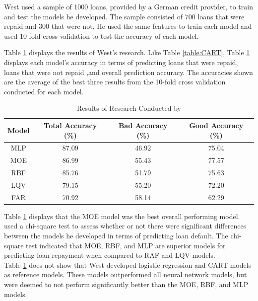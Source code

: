 West used a sample of 1000 loans, provided by a German credit provider, to train and test the models he developed. The sample consisted of 700 loans that were repaid and 300 that were not. He used the same features to train each model and used 10-fold cross validation to test the accuracy of each model. 

\vspace{10pt}

Table \ref{table:NN} displays the results of West's research. Like Table \ref{table:CART}, Table \ref{table:NN} displays each model's accuracy in terms of predicting loans that were repaid, loans that were not repaid ,and overall prediction accuracy. The accuracies shown are the average of the best three results from the 10-fold cross validation conducted for each model. 

\vspace{10pt}

\begin{table}[H]
\begin{center}
\begin{tabular}{|c|c|c|c|} 
\hline
\multicolumn{1}{|c}{Model}  &\multicolumn{1}{|c|}{Total Accuracy (\%)}  &\multicolumn{1}{|c|}{Bad Accuracy (\%)} & \multicolumn{1}{c|}{Good Accuracy (\%)}\\
\hline
MLP & 87.09 &  46.92 & 75.04 \\
\hline
MOE & 86.99 &  55.43 & 77.57 \\
\hline
RBF & 85.76 &  51.79 & 75.63 \\
\hline
LQV & 79.15 &  55.20 & 72.20 \\
\hline
FAR & 70.92 &  58.14 & 62.29 \\
\hline
\end{tabular}
\end{center}
\caption{Results of Research Conducted by \textcite{NNWest}}
\label{table:NN}
\end{table}

\vspace{10pt}

Table \ref{table:NN} displays that the MOE model was the best overall performing model. \textcite{NNWest} used a chi-square test to assess whether or not there were significant differences between the models he developed in terms of predicting loan default. The chi-square test indicated that MOE, RBF, and MLP are superior models for predicting loan repayment when compared to RAF and LQV models. \\

Table \ref{table:NN} does not show that West developed logistic regression and CART models as reference models. These models outperformed all neural network models, but were deemed to not perform significantly better than the MOE, RBF, and MLP models. \newpage

